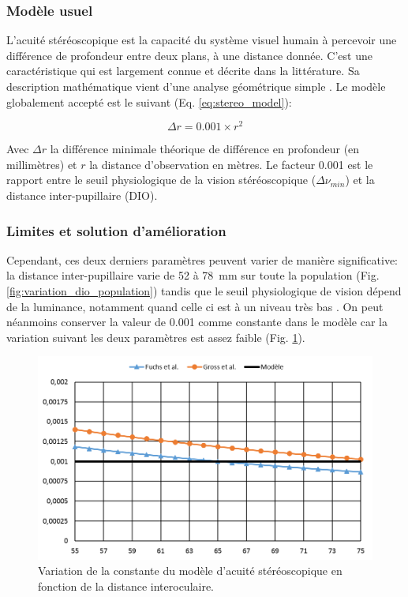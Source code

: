	\subsubsection{Modèle usuel}	
	\par L'acuité stéréoscopique est la capacité du système visuel humain à percevoir une différence de profondeur entre deux plans, à une distance donnée. C'est une caractéristique qui est largement connue et décrite dans la littérature. Sa description mathématique vient d'une analyse géométrique simple \citep{fuchs_traite_2003,gross_human_2008}. Le modèle globalement accepté est le suivant (Eq. \ref{eq:stereo_model}):

	\begin{equation}	
		\Delta r = 0.001 \times r^2
		\label{eq:stereo_model}
	\end{equation}
	 
	\par Avec $\Delta r$ la différence minimale théorique de différence en profondeur (en millimètres) et $r$ la distance d'observation en mètres. Le facteur 0.001 est le rapport entre le seuil physiologique de la vision stéréoscopique ($\Delta \nu_{min}$) et la distance inter-pupillaire (DIO).
	
	\subsubsection{Limites et solution d'amélioration}
	\par Cependant, ces deux derniers paramètres peuvent varier de manière significative: la distance inter-pupillaire varie de 52 à 78~mm sur toute la population \citep{dodgson_variation_2004} (Fig. \ref{fig:variation_dio_population}) tandis que le seuil physiologique de vision dépend de la luminance, notamment quand celle ci est à un niveau très bas \citep{gross_human_2008}. On peut néanmoins conserver la valeur de 0.001 comme constante dans le modèle car la variation suivant les deux paramètres est assez faible (Fig. \ref{fig:variation_constante_dio}).
	
	\begin{figure}[h]
		\centering
		\includegraphics[scale=.9]{Figures/FractionVariation}
		\caption{Variation de la constante du modèle d'acuité stéréoscopique en fonction de la distance interoculaire.}
		\label{fig:variation_constante_dio}
	\end{figure}
	
